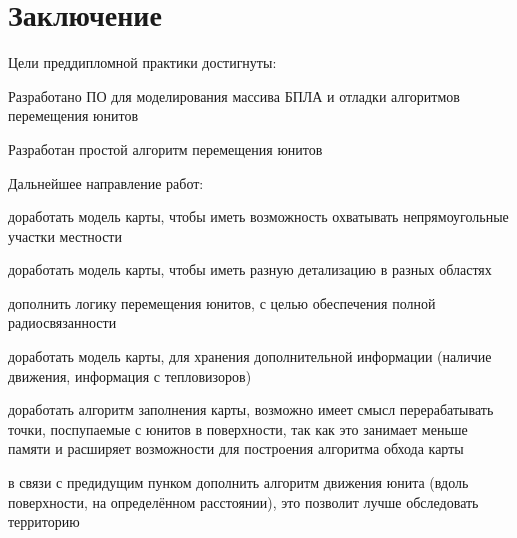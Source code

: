 \newpage
\section{Заключение}

Цели преддипломной практики достигнуты:
\begin{mintemize}

\item Разработано ПО для моделирования массива БПЛА
      и отладки алгоритмов перемещения юнитов

\item Разработан простой алгоритм перемещения юнитов
\end{mintemize}

Дальнейшее направление работ:
\begin{mintemize}
    \item доработать модель карты, чтобы иметь возможность охватывать непрямоугольные участки местности
    \item доработать модель карты, чтобы иметь разную детализацию в разных областях
    \item дополнить логику перемещения юнитов, с целью обеспечения полной радиосвязанности
    \item доработать модель карты, для хранения дополнительной информации (наличие движения, информация с тепловизоров)
    \item доработать алгоритм заполнения карты, возможно имеет смысл перерабатывать точки, поспупаемые с юнитов в 
            поверхности, так как это занимает меньше памяти и расширяет возможности для построения алгоритма обхода карты
    \item в связи с предидущим пунком дополнить алгоритм движения юнита (вдоль поверхности, на определённом расстоянии),
            это позволит лучше обследовать территорию
\end{mintemize}
